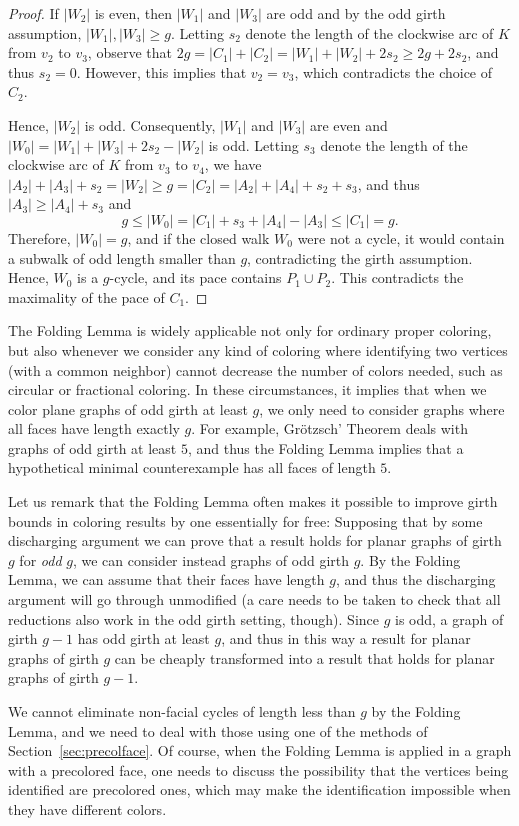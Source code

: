 \documentclass[12pt,twoside,openright,a4paper]{book}
\begin{document}
\begin{proof}
If $|W_2|$ is even, then $|W_1|$ and $|W_3|$ are odd and by the odd girth assumption, $|W_1|,|W_3|\ge g$.
Letting $s_2$ denote the length of the clockwise arc of $K$ from $v_2$ to $v_3$, observe that
$2g=|C_1|+|C_2|=|W_1|+|W_2|+2s_2\ge 2g+2s_2$, and thus $s_2=0$.  However, this implies that $v_2=v_3$, which contradicts the choice of $C_2$.

Hence, $|W_2|$ is odd.  Consequently, $|W_1|$ and $|W_3|$ are even and $|W_0|=|W_1|+|W_3|+2s_2-|W_2|$ is odd.
Letting $s_3$ denote the length of the clockwise arc of $K$ from $v_3$ to $v_4$, we have
$|A_2|+|A_3|+s_2=|W_2|\ge g=|C_2|=|A_2|+|A_4|+s_2+s_3$,
and thus $|A_3|\ge |A_4|+s_3$ and
$$g\le |W_0|=|C_1|+s_3+|A_4|-|A_3|\le |C_1|=g.$$
Therefore, $|W_0|=g$, and if the closed walk $W_0$ were not a cycle, it would contain a subwalk of odd length smaller than $g$,
contradicting the girth assumption.  Hence, $W_0$ is a $g$-cycle, and its pace contains $P_1\cup P_2$.  This contradicts the maximality
of the pace of $C_1$.
\end{proof}
The Folding Lemma is widely applicable not only for ordinary proper coloring, but
also whenever we consider any kind of coloring where identifying two vertices
(with a common neighbor) cannot decrease the number of colors needed, such as
circular or fractional coloring.  In these circumstances, it implies that when we color
plane graphs of odd girth at least $g$, we only need to consider graphs where all faces
have length exactly $g$.  For example, Gr\"otzsch' Theorem deals with graphs of odd girth at least $5$,
and thus the Folding Lemma implies that a hypothetical minimal counterexample has all faces of length $5$.

Let us remark that the Folding Lemma often makes it possible to improve girth bounds in coloring results
by one essentially for free: Supposing that by some discharging argument we can prove that a result
holds for planar graphs of girth $g$ for \emph{odd} $g$, we can consider instead graphs of odd girth $g$.
By the Folding Lemma, we can assume that their faces have length $g$, and thus the discharging argument
will go through unmodified (a care needs to be taken to check that all reductions also work in the odd girth
setting, though).  Since $g$ is odd, a graph of girth $g-1$ has odd girth at least $g$, and thus
in this way a result for planar graphs of girth $g$ can be cheaply transformed into a result
that holds for planar graphs of girth $g-1$.

We cannot eliminate non-facial cycles of length less than $g$ by the Folding Lemma,
and we need to deal with those using one of the methods of Section~\ref{sec:precolface}.  Of course,
when the Folding Lemma is applied in a graph with a precolored face, one needs to discuss the possibility
that the vertices being identified are precolored ones, which may make the identification impossible
when they have different colors.
\end{document}
